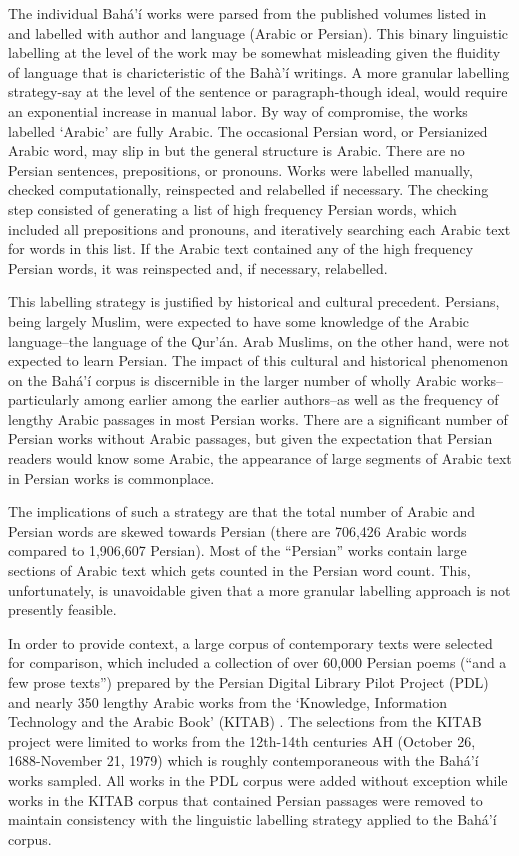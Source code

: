 \documentclass[12pt, oneside]{report}
\begin{document}
\par 
The individual Bah\'{a}'\'{i} works were parsed from the published volumes listed in  and labelled with author and language (Arabic or Persian). This binary linguistic labelling at the level of the work may be somewhat misleading given the fluidity of language that is charicteristic of the Bah\`{a}'\'{i} writings. A more granular labelling strategy-say at the level of the sentence or paragraph-though ideal, would require an exponential increase in manual labor. By way of compromise, the works labelled `Arabic' are fully Arabic. The occasional Persian word, or Persianized Arabic word, may slip in but the general structure is Arabic. There are no Persian sentences, prepositions, or pronouns. Works were labelled manually, checked computationally, reinspected and relabelled if necessary. The checking step consisted of generating a list of high frequency Persian words, which included all prepositions and pronouns, and iteratively searching each Arabic text for words in this list. If the Arabic text contained any of the high frequency Persian words, it was reinspected and, if necessary, relabelled.
\par
This labelling strategy is justified by historical and cultural precedent. Persians, being largely Muslim, were expected to have some knowledge of the Arabic language–the language of the Qur'\'{a}n. Arab Muslims, on the other hand, were not expected to learn Persian. The impact of this cultural and historical phenomenon on the Bah\'{a}'\'{i} corpus is discernible in the larger number of wholly Arabic works–particularly among earlier among the earlier authors–as well as the frequency of lengthy Arabic passages in most Persian works. There are a significant number of Persian works without Arabic passages, but given the expectation that Persian readers would know some Arabic, the appearance of large segments of Arabic text in Persian works is commonplace. 
\par
The implications of such a strategy are that the total number of Arabic and Persian words are skewed towards Persian (there are 706,426 Arabic words compared to 1,906,607 Persian). Most of the ``Persian'' works contain large sections of Arabic text which gets counted in the Persian word count. This, unfortunately, is unavoidable given that a more granular labelling approach is not presently feasible.
\par
In order to provide context, a large corpus of contemporary texts were selected for comparison, which included a collection of over 60,000 Persian poems (``and a few prose texts'') prepared by the Persian Digital Library Pilot Project (PDL) \cite{noauthor_persian_nodate} and nearly 350 lengthy Arabic works from the `Knowledge, Information Technology and the Arabic Book' (KITAB) \cite{maxim_romanov_openiti:_2019}. The selections from the KITAB project were limited to works from the 12th-14th centuries AH (October 26, 1688-November 21, 1979) which is roughly contemporaneous with the Bah\'{a}'\'{i} works sampled. All works in the PDL corpus were added without exception while works in the KITAB corpus that contained Persian passages were removed to maintain consistency with the linguistic labelling strategy applied to the Bah\'{a}'\'{i} corpus. 
\end{document}
